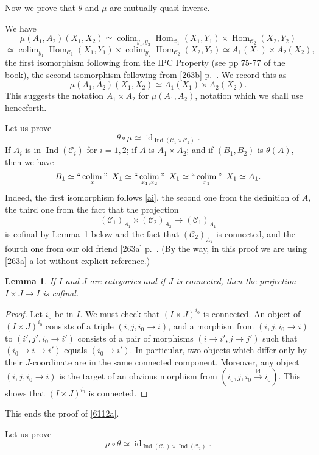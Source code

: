 \documentclass[12pt]{article}
\newtheorem{lem}[thm]{Lemma}
\theoremstyle{remark}
\theoremstyle{definition}
\newcommand{\C}{\mathcal C}
\newcommand{\xr}{\xrightarrow}
\DeclareMathOperator*{\coli}{colim}
\DeclareMathOperator*{\co}{colim}
\DeclareMathOperator*{\ic}{``\coli"}
\DeclareMathOperator{\id}{id}
\DeclareMathOperator{\Hom}{Hom}%
\DeclareMathOperator{\Ind}{Ind}
\begin{document}
Now we prove that $\theta$ and $\mu$ are mutually quasi-inverse.

We have 
$$
\mu(A_1,A_2)(X_1,X_2)\simeq\co_{y_1,y_2}\Hom_{\C_1}(X_1,Y_1)\times\Hom_{\C_2}(X_2,Y_2)
$$
$$
\simeq\co_{y_1}\Hom_{\C_1}(X_1,Y_1)\times\co_{y_2}\Hom_{\C_2}(X_2,Y_2)\simeq A_1(X_1)\times A_2(X_2),
$$ 
the first isomorphism following from the IPC Property (see pp 75-77 of the book), the second isomorphism following from \eqref{263b} p.~\pageref{263b}. We record this as
$$
\mu(A_1,A_2)(X_1,X_2)\simeq A_1(X_1)\times A_2(X_2).
$$
This suggests the notation $A_1\times A_2$ for $\mu(A_1,A_2)$, notation which we shall use henceforth.

Let us prove
%
\begin{equation}\label{6112a}
\theta\circ\mu\simeq\id_{\Ind(\C_1\times\C_2)}.
\end{equation}
%
If $A_i$ is in $\Ind(\C_i)$ for $i=1,2$; if $A$ is $A_1\times A_2$; and if $(B_1,B_2)$ is $\theta(A)$, then we have 
$$ 
B_1\simeq\ic_x\ X_1\simeq\ic_{x_1,x_2}\ X_1\simeq\ic_{x_1}\ X_1\simeq A_1.
$$ 
Indeed, the first isomorphism follows \eqref{ai}, the second one from the definition of $A$, the third one from the fact that the projection 
$$
(\C_1)_{A_1}\times(\C_2)_{A_2}\to(\C_1)_{A_1}
$$ 
is cofinal by Lemma~\ref{proj} below and the fact that $(\C_2)_{A_2}$ is connected, and the fourth one from our old friend \eqref{263a} p.~\pageref{263a}. (By the way, in this proof we are using \eqref{263a} a lot without explicit reference.)
%
\begin{lem}\label{proj}
If $I$ and $J$ are categories and if $J$ is connected, then the projection $I\times J\to I$ is cofinal.
\end{lem}
%
\begin{proof}
Let $i_0$ be in $I$. We must check that $(I\times J)^{i_0}$ is connected. An object of $(I\times J)^{i_0}$ consists of a triple $(i,j,i_0\to i)$, and a morphism from $(i,j,i_0\to i)$ to $(i',j',i_0\to i')$ consists of a pair of morphisms $(i\to i',j\to j')$ such that $(i_0\to i\to i')$ equals $(i_0\to i')$. In particular, two objects which differ only by their $J$-coordinate are in the same connected component. Moreover, any object $(i,j,i_0\to i)$ is the target of an obvious morphism from $(i_0,j,i_0\xr{\id}i_0)$. This shows that $(I\times J)^{i_0}$ is connected.
\end{proof}

This ends the proof of \eqref{6112a}.

Let us prove
%
\begin{equation}\label{6112b}
\mu\circ\theta\simeq\id_{\Ind(\C_1)\times\Ind(\C_2)}.
\end{equation}
\end{document}
